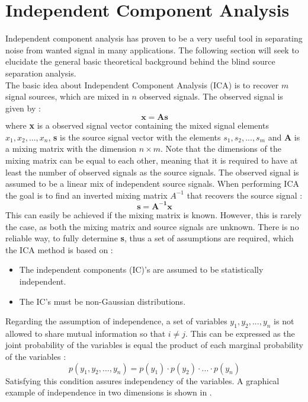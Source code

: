 
\section{Independent Component Analysis} \label{sec:ICA}
Independent component analysis has proven to be a very useful tool in separating noise from wanted signal in many applications. The following section will seek to elucidate the general basic theoretical background behind the blind source separation analysis.  \\
The basic idea about Independent Component Analysis (ICA) is to recover $m$ signal sources, which are mixed in $n$ observed signals. The observed signal is given by \cite{Hyvarinen2001}:
\begin{equation}
\mathbf{x} = \mathbf{A}\mathbf{s}
\end{equation}
where \textbf{x} is a observed signal vector containing the mixed signal elements $x_1, x_2, ..., x_n$, \textbf{s} is the source signal vector with the elements $s_1, s_2, ..., s_m$ and $\mathbf{A}$ is a mixing matrix with the dimension $n \times m$. Note that the dimensions of the mixing matrix can be equal to each other, meaning that it is required to have at least the number of observed signals as the source signals. The observed signal is assumed to be a linear mix of independent source signals. When performing ICA the goal is to find an inverted mixing matrix \textbf{$A^{-1}$} that recovers the source signal \cite{Hyvarinen2001}:
\begin{equation}
\mathbf{s} = \mathbf{A^{-1}}\mathbf{x}
\end{equation}
This can easily be achieved if the mixing matrix is known. However, this is rarely the case, as both the mixing matrix and source signals are unknown. There is no reliable way, to fully determine \textbf{s}, thus a set of assumptions are required, which the ICA method is based on \cite{Hyvarinen2001}:
\begin{itemize}
	\item The independent components (IC)’s are assumed to be statistically independent.
	\item The IC’s must be non-Gaussian distributions.
\end{itemize}
Regarding the assumption of independence, a set of variables $y_1, y_2, ..., y_n$ is not allowed to share mutual information so that $i \neq j$. This can be expressed as the joint probability of the variables is equal the product of each marginal probability of the variables \cite{Hyvarinen2001}:
\begin{equation}
p(y_1, y_2, …, y_n) = p(y_1) \cdot p(y_2) \cdot ... \cdot p(y_n) 
\end{equation} \label{eq:independence}
Satisfying this condition assures independency of the variables. A graphical example of independence in two dimensions is shown in  \cite{Hyvarinen2001, Hyvarinen2000}. 

